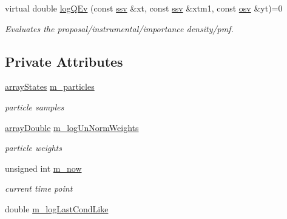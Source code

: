 \begin{DoxyCompactItemize}
virtual double \hyperlink{classSISRFilter_a7600d725a1fc3b1888011d6f4b480277}{log\+Q\+Ev} (const \hyperlink{classSISRFilter_aeaa3ff0465a0b260710a17238a95212c}{ssv} \&xt, const \hyperlink{classSISRFilter_aeaa3ff0465a0b260710a17238a95212c}{ssv} \&xtm1, const \hyperlink{classSISRFilter_ad3449fbd43f19dbda6b80459d729d9bf}{osv} \&yt)=0
\begin{DoxyCompactList}\small\item\em Evaluates the proposal/instrumental/importance density/pmf. \end{DoxyCompactList}\end{DoxyCompactItemize}
\subsection*{Private Attributes}
\begin{DoxyCompactItemize}
\item 
\hyperlink{classSISRFilter_aea07f74ad2073e48134a1b8130a1e2cf}{array\+States} \hyperlink{classSISRFilter_a95714b04f23311f34d0039aaaa3fe63f}{m\+\_\+particles}\hypertarget{classSISRFilter_a95714b04f23311f34d0039aaaa3fe63f}{}\label{classSISRFilter_a95714b04f23311f34d0039aaaa3fe63f}

\begin{DoxyCompactList}\small\item\em particle samples \end{DoxyCompactList}\item 
\hyperlink{classSISRFilter_a6925bb8edf01ea99ddcff65b277cb72c}{array\+Double} \hyperlink{classSISRFilter_a22bf284333a254dc1cd1a3b2d5e1695a}{m\+\_\+log\+Un\+Norm\+Weights}\hypertarget{classSISRFilter_a22bf284333a254dc1cd1a3b2d5e1695a}{}\label{classSISRFilter_a22bf284333a254dc1cd1a3b2d5e1695a}

\begin{DoxyCompactList}\small\item\em particle weights \end{DoxyCompactList}\item 
unsigned int \hyperlink{classSISRFilter_a84f75ff76f3fb59e9a9d6ec32c933894}{m\+\_\+now}\hypertarget{classSISRFilter_a84f75ff76f3fb59e9a9d6ec32c933894}{}\label{classSISRFilter_a84f75ff76f3fb59e9a9d6ec32c933894}

\begin{DoxyCompactList}\small\item\em current time point \end{DoxyCompactList}\item 
double \hyperlink{classSISRFilter_af44e288a4041f26e6adf585f96b2a62d}{m\+\_\+log\+Last\+Cond\+Like}\hypertarget{classSISRFilter_af44e288a4041f26e6adf585f96b2a62d}{}\label{classSISRFilter_af44e288a4041f26e6adf585f96b2a62d}


\end{DoxyCompactItemize}
